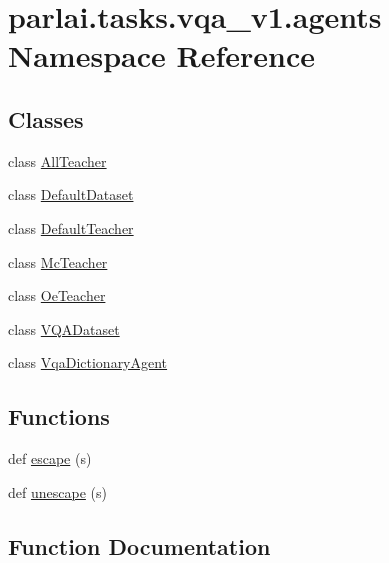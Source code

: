 \hypertarget{namespaceparlai_1_1tasks_1_1vqa__v1_1_1agents}{}\section{parlai.\+tasks.\+vqa\+\_\+v1.\+agents Namespace Reference}
\label{namespaceparlai_1_1tasks_1_1vqa__v1_1_1agents}
\subsection*{Classes}
\begin{DoxyCompactItemize}
\item 
class \hyperlink{classparlai_1_1tasks_1_1vqa__v1_1_1agents_1_1AllTeacher}{All\+Teacher}
\item 
class \hyperlink{classparlai_1_1tasks_1_1vqa__v1_1_1agents_1_1DefaultDataset}{Default\+Dataset}
\item 
class \hyperlink{classparlai_1_1tasks_1_1vqa__v1_1_1agents_1_1DefaultTeacher}{Default\+Teacher}
\item 
class \hyperlink{classparlai_1_1tasks_1_1vqa__v1_1_1agents_1_1McTeacher}{Mc\+Teacher}
\item 
class \hyperlink{classparlai_1_1tasks_1_1vqa__v1_1_1agents_1_1OeTeacher}{Oe\+Teacher}
\item 
class \hyperlink{classparlai_1_1tasks_1_1vqa__v1_1_1agents_1_1VQADataset}{V\+Q\+A\+Dataset}
\item 
class \hyperlink{classparlai_1_1tasks_1_1vqa__v1_1_1agents_1_1VqaDictionaryAgent}{Vqa\+Dictionary\+Agent}
\end{DoxyCompactItemize}
\subsection*{Functions}
\begin{DoxyCompactItemize}
\item 
def \hyperlink{namespaceparlai_1_1tasks_1_1vqa__v1_1_1agents_a09703660c96aab40da3aa7f2386486cb}{escape} (s)
\item 
def \hyperlink{namespaceparlai_1_1tasks_1_1vqa__v1_1_1agents_ab44e9835e0cedea3719e3baebfe0e94b}{unescape} (s)
\end{DoxyCompactItemize}


\subsection{Function Documentation}
\mbox{\label{namespaceparlai_1_1tasks_1_1vqa__v1_1_1agents_a09703660c96aab40da3aa7f2386486cb}} 
